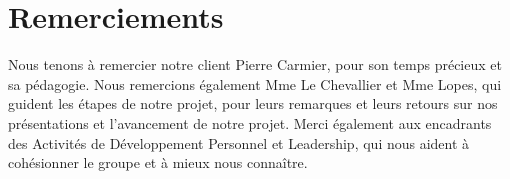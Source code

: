 \section{Remerciements}
Nous tenons à remercier notre client Pierre Carmier, pour son temps précieux et sa pédagogie. 
Nous remercions également Mme Le Chevallier et Mme Lopes, qui guident les étapes de notre projet, pour leurs remarques et leurs retours sur nos présentations et l'avancement de notre projet.
Merci également aux encadrants des Activités de Développement Personnel et Leadership, qui nous aident à cohésionner le groupe et à mieux nous connaître.